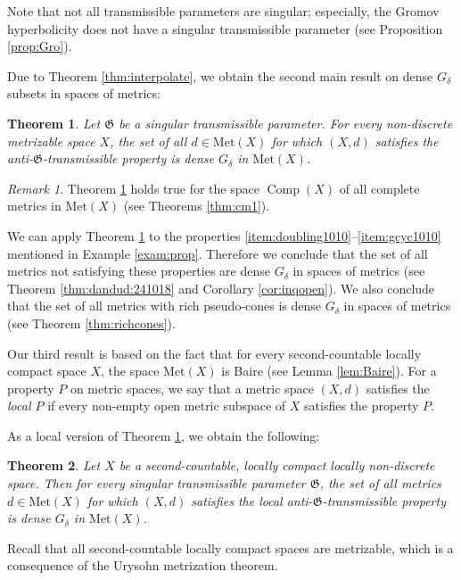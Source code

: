 \documentclass[a4paper, 12pt]{amsart}
\theoremstyle{plain}
\newtheorem{thm}{Theorem}[section]
\theoremstyle{definition}
\theoremstyle{remark}
\newtheorem{rmk}{Remark}[section]
\DeclareMathOperator{\cm}{Comp}
\newcommand{\met}[1]{\mathrm{Met}(#1)}
\begin{document}
Note that not all transmissible parameters are singular;
especially, 
the Gromov hyperbolicity 
does not have
 a singular transmissible  parameter (see Proposition \ref{prop:Gro}).    





Due to Theorem 
\ref{thm:interpolate}, 
we obtain the second main result on dense 
$G_{\delta}$ 
subsets in spaces of metrics:
\begin{thm}\label{thm:trans}
Let 
$\mathfrak{G}$ 
be a singular transmissible parameter. 
For every non-discrete metrizable space $X$, 
the set of all 
$d\in \met{X}$ 
for which 
$(X, d)$ 
satisfies the
anti-$\mathfrak{G}$-transmissible property
 is dense 
 $G_{\delta}$ in $\met{X}$.  
\end{thm}









\begin{rmk}
Theorem 
\ref{thm:trans} 
holds true for the 
space 
$\cm(X)$ 
of all complete metrics in 
$\met{X}$ 
(see Theorems \ref{thm:cm1}). 
\end{rmk}


We can apply Theorem 
\ref{thm:trans} 
to the properties
\ref{item:doubling1010}--\ref{item:gcyc1010}
mentioned  in Example \ref{exam:prop}. 
Therefore we conclude
 that
  the set of all metrics not satisfying these properties 
are dense 
$G_{\delta}$ 
in spaces of metrics 
(see 
Theorem \ref{thm:dandud:241018} 
and Corollary \ref{cor:inqopen}). 
We also conclude that the set of all metrics with rich pseudo-cones is 
dense 
$G_{\delta}$ 
in spaces of metrics 
(see Theorem \ref{thm:richcones}). 





Our third result is based on the fact that for 
every 
second-countable locally compact space 
$X$, 
the space 
$\met{X}$ 
is  Baire 
(see Lemma 
\ref{lem:Baire}). 
For a property 
$P$ 
on metric spaces, 
we say that a metric space 
$(X, d)$ 
satisfies the 
\emph{local $P$} 
if 
every non-empty open metric  subspace of 
$X$ 
satisfies the property 
$P$. 





As a local version of Theorem 
\ref{thm:trans}, 
we obtain the following:
\begin{thm}\label{thm:loctrans}
Let 
$X$ 
be a second-countable, 
locally compact locally non-discrete space. 
Then for every singular transmissible parameter 
$\mathfrak{G}$, 
the set of all metrics 
$d\in \met{X}$ 
for which 
$(X, d)$ 
satisfies 
the local 
anti-$\mathfrak{G}$-transmissible property
 is dense 
 $G_{\delta}$ 
 in 
 $\met{X}$. 
\end{thm}
Recall 
 that 
all second-countable locally compact spaces are metrizable,  
which is a consequence of 
the Urysohn metrization theorem. 
\end{document}
